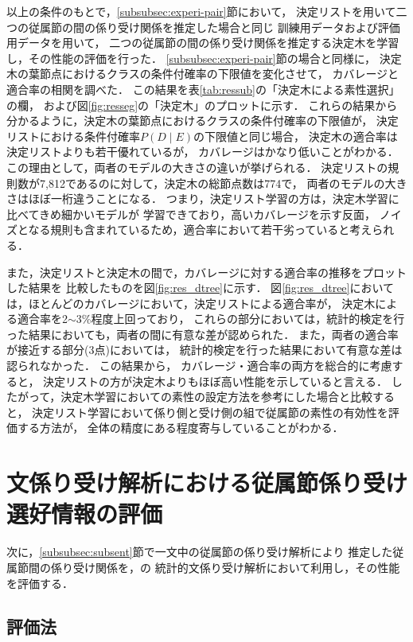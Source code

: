 以上の条件のもとで，\ref{subsubsec:experi-pair}節において，
決定リストを用いて二つの従属節の間の係り受け関係を推定した場合と同じ
訓練用データおよび評価用データを用いて，
二つの従属節の間の係り受け関係を推定する決定木を学習し，その性能の評価を行った．
\ref{subsubsec:experi-pair}節の場合と同様に，
決定木の葉節点におけるクラスの条件付確率の下限値を変化させて，
カバレージと適合率の相関を調べた．
この結果を表\ref{tab:ressub}の「決定木による素性選択」の欄，
および図\ref{fig:resseg}の「決定木」\mbox{のプロットに示}す．
これらの結果から分かるように，決定木の葉節点におけるクラスの条件付確率の下限値が，
決定リストにおける条件付確率$P(D\mid E)$の下限値と同じ場合，
決定木の適合率は決定リストよりも若干優れているが，
カバレージはかなり低いことがわかる．
この理由として，両者のモデルの大きさの違いが挙げられる．
決定リストの規則数が7,812であるのに対して，決定木の総節点数は774で，
両者のモデルの大きさはほぼ一桁違うことになる．
つまり，決定リスト学習の方は，決定木学習に比べてきめ細かいモデルが
学習できており，高いカバレージを示す反面，
ノイズとなる規則も含まれているため，適合率において若干劣っていると考えられる．

また，決定リストと決定木の間で，カバレージに対する適合率の推移をプロットした結果を
\mbox{比較したもの}を図\ref{fig:res_dtree}に示す．
図\ref{fig:res_dtree}においては，ほとんどのカバレージにおいて，\mbox{決定リストに}よる適合率が，
決定木による適合率を2$\sim$3\%程度上回っており，
これらの部分においては，統計的検定を行った結果においても，両者の間に有意な差が認められた．
また，両者の適合率が接近する部分(3点)においては，
統計的検定を行った結果において有意な差は認られなかった．
この結果から，
カバレージ・適合率の両方を総合的に考慮すると，
決定リストの方が決定木よりもほぼ高い性能を示していると言える．
したがって，決定木学習において\cite{Haruno98cj}の素性の設定方法を参考にした場合と比較すると，
決定リスト学習において係り側と受け側の組で従属節の素性の有効性を評価する方法が，
全体の精度にある程度寄与していることがわかる．


\section{文係り受け解析における従属節係り受け選好情報の評価}
\label{sec:sentana}

次に，\ref{subsubsec:subsent}節で一文中の従属節の係り受け解析により
推定した従属節間の係り受け関係を，\cite{Fujio97aj,Fujio99aj}の
統計的文係り受け解析において利用し，その性能を評価する．

\vspace{-1mm}
\subsection{評価法}
\label{subsec:sentM}

